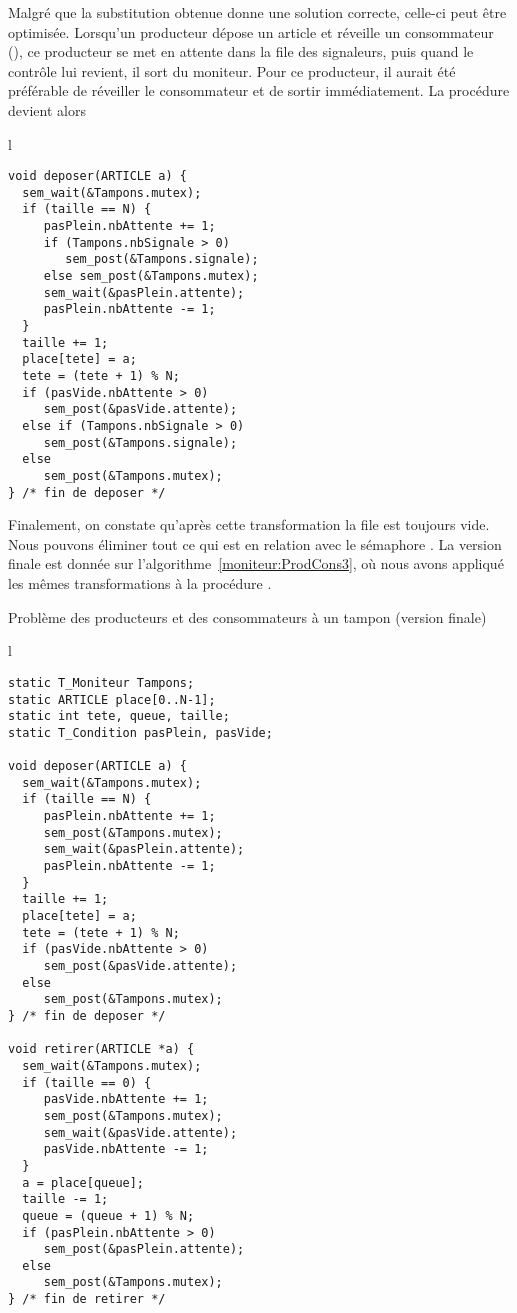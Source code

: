 Malgré que la substitution obtenue donne une solution correcte, celle-ci peut être optimisée. Lorsqu'un producteur dépose un article et réveille un consommateur (), ce producteur se met en attente dans la file des signaleurs, puis quand le contrôle lui revient, il sort du moniteur. Pour ce producteur, il aurait été préférable de réveiller le consommateur et de sortir immédiatement. La procédure  devient alors %
\centering
\begin{tabular}{l}
\lstset{language=C++}
\begin{lstlisting}
void deposer(ARTICLE a) {
  sem_wait(&Tampons.mutex);
  if (taille == N) {
     pasPlein.nbAttente += 1;
     if (Tampons.nbSignale > 0)
        sem_post(&Tampons.signale);
     else sem_post(&Tampons.mutex);
     sem_wait(&pasPlein.attente);
     pasPlein.nbAttente -= 1;
  }
  taille += 1;
  place[tete] = a;
  tete = (tete + 1) % N;
  if (pasVide.nbAttente > 0)
     sem_post(&pasVide.attente);
  else if (Tampons.nbSignale > 0)
     sem_post(&Tampons.signale);
  else
     sem_post(&Tampons.mutex);
} /* fin de deposer */
\end{lstlisting}
\end{tabular}

Finalement, on constate qu'après cette transformation la file  est toujours vide. Nous pouvons éliminer tout ce qui est en relation avec le sémaphore . La version finale est donnée sur l'algorithme~\ref{moniteur:ProdCons3},  où nous avons appliqué les mêmes transformations à la procédure .

\begin{algorithm}[!ht]
\caption{Problème des producteurs et des consommateurs à un tampon (version finale)}\label{moniteur:ProdCons3}
\centering
\begin{tabular}{l}
\lstset{language=C++}
\begin{lstlisting}
static T_Moniteur Tampons;
static ARTICLE place[0..N-1];
static int tete, queue, taille;
static T_Condition pasPlein, pasVide;

void deposer(ARTICLE a) {
  sem_wait(&Tampons.mutex);
  if (taille == N) {
     pasPlein.nbAttente += 1;
     sem_post(&Tampons.mutex);
     sem_wait(&pasPlein.attente);
     pasPlein.nbAttente -= 1;
  }
  taille += 1;
  place[tete] = a;
  tete = (tete + 1) % N;
  if (pasVide.nbAttente > 0)
     sem_post(&pasVide.attente);
  else
     sem_post(&Tampons.mutex);
} /* fin de deposer */

void retirer(ARTICLE *a) {
  sem_wait(&Tampons.mutex);
  if (taille == 0) {
     pasVide.nbAttente += 1;
     sem_post(&Tampons.mutex);
     sem_wait(&pasVide.attente);
     pasVide.nbAttente -= 1;
  }
  a = place[queue];
  taille -= 1;
  queue = (queue + 1) % N;
  if (pasPlein.nbAttente > 0)
     sem_post(&pasPlein.attente);
  else
     sem_post(&Tampons.mutex);
} /* fin de retirer */
\end{lstlisting}
\end{tabular}

\end{algorithm}

